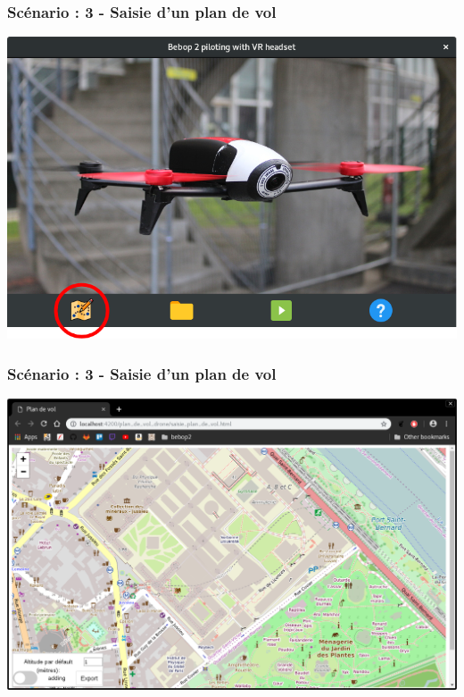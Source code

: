 \documentclass{beamer}
\begin{document}
	\begin{frame}
		\begin{center}
		\frametitle{Scénario : 3 - Saisie d'un plan de vol}

        \includegraphics[scale=0.4]{createMap.png}
		\end{center}
	\end{frame}
	


	\begin{frame}
		\begin{center}
		\frametitle{Scénario : 3 - Saisie d'un plan de vol}

        \includegraphics[scale=0.28]{map-GUI.png}
		\end{center}
	\end{frame}
	
\end{document}
